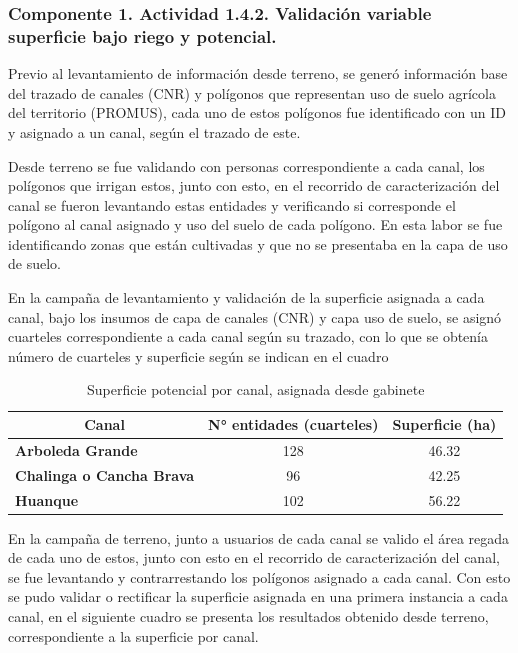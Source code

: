 \documentclass[]{article}
\begin{document}
\subsubsection{Componente 1. Actividad 1.4.2. Validación variable superficie bajo riego y potencial.}

Previo al levantamiento de información desde terreno, se generó información base del trazado de canales (CNR) y polígonos que representan uso de suelo agrícola del territorio (PROMUS), cada uno de estos polígonos fue identificado  con un ID y asignado a un canal, según el trazado de este.

Desde terreno se fue validando con personas correspondiente a cada canal, los polígonos que irrigan estos, junto con esto, en el recorrido de caracterización del canal se fueron levantando estas entidades y verificando si corresponde el polígono al canal asignado y uso del suelo de cada polígono. En esta labor se fue identificando zonas que están cultivadas y que no se presentaba en la capa de uso de suelo.

En la campaña de levantamiento y validación de la superficie asignada a cada canal, bajo los insumos de capa de canales (CNR) y capa uso de suelo, se asignó cuarteles correspondiente a cada canal según su trazado, con lo que se obtenía número de cuarteles y superficie según se indican en el  cuadro


\begin{table}[H]
\centering
\caption{Superficie potencial por canal, asignada desde gabinete}
\label{my-label}
\begin{tabular}{|l|c|c|}
\hline
\multicolumn{1}{|c|}{\textbf{Canal}} & \textbf{N° entidades (cuarteles)} & \textbf{Superficie (ha)} \\ \hline
\textbf{Arboleda Grande}             & 128                               & 46.32                    \\ \hline
\textbf{Chalinga o Cancha Brava}     & 96                                & 42.25                    \\ \hline
\textbf{Huanque}                     & 102                               & 56.22                    \\ \hline
\end{tabular}
\end{table}

En la campaña de terreno, junto a usuarios de cada canal se valido el área regada de cada uno de estos, junto con esto en el recorrido de caracterización del canal, se fue levantando y contrarrestando los polígonos asignado a cada canal. Con esto se pudo validar o rectificar la superficie asignada en una primera instancia a cada canal, en el siguiente cuadro se presenta los resultados obtenido desde terreno, correspondiente a la superficie por canal.
\end{document}
